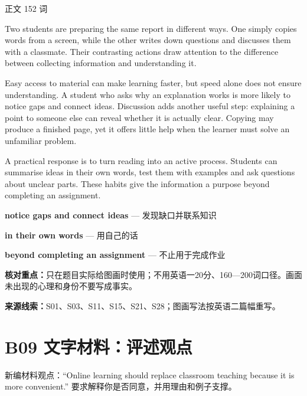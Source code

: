 \documentclass[11pt,a4paper,fontset=macnew]{ctexart}
\newenvironment{example}{\begingroup\fontsize{11}{14.3}\selectfont\setlength{\parskip}{4pt}}{\par\endgroup}
\begin{document}
\par\vspace{4pt}{\bfseries 完整套用示例}\par\nopagebreak
{\small 正文 152 词}\par
\begin{example}
Two students are preparing the same report in different ways. One simply copies words from a screen, while the other writes down questions and discusses them with a classmate. Their contrasting actions draw attention to the difference between collecting information and understanding it.

Easy access to material can make learning faster, but speed alone does not ensure understanding. A student who asks why an explanation works is more likely to notice gaps and connect ideas. Discussion adds another useful step: explaining a point to someone else can reveal whether it is actually clear. Copying may produce a finished page, yet it offers little help when the learner must solve an unfamiliar problem.

A practical response is to turn reading into an active process. Students can summarise ideas in their own words, test them with examples and ask questions about unclear parts. These habits give the information a purpose beyond completing an assignment.

\end{example}
\par\vspace{4pt}{\bfseries 好词好句：优先记这三处}\par\nopagebreak
{\small\textbf{notice gaps and connect ideas} — 发现缺口并联系知识}\par
{\small\textbf{in their own words} — 用自己的话}\par
{\small\textbf{beyond completing an assignment} — 不止用于完成作业}\par
{\small\textbf{核对重点：}只在题目实际给图画时使用；不用英语一20分、160—200词口径。画面未出现的心理和身份不要写成事实。}\par
{\fontsize{8}{10}\selectfont\textbf{来源线索：}S01、S03、S11、S15、S21、S28；图画写法按英语二篇幅重写。}\par
\clearpage\section*{B09  文字材料：评述观点}
{\small 新编材料观点：“Online learning should replace classroom teaching because it is more convenient.” 要求解释你是否同意，并用理由和例子支撑。}\par
\end{document}
